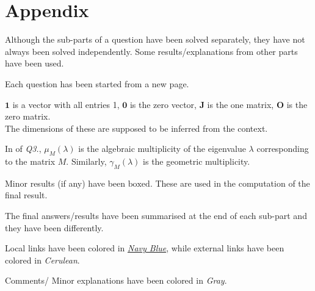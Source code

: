 \documentclass[12pt,titlepage]{report}
\begin{document}
\newpage

\hypertarget{app}{\section*{Appendix}}

\begin{itemize}
    \item Although the sub-parts of a question have been solved separately, they have not always been solved independently. Some results/explanations from other parts have been used.
    \item Each question has been started from a new page.
    \item $\mathbf{1}$ is a vector with all entries 1, $\mathbf{0}$ is the zero vector, $\mathbf{J}$ is the one matrix, $\mathbf{O}$ is the zero matrix. \\
    The dimensions of these are supposed to be inferred from the context.
    \item In  of \textit{Q3.}, $\mu_M(\lambda)$ is the algebraic multiplicity of the eigenvalue $\lambda$ corresponding to the matrix $M$. Similarly, $\gamma_M(\lambda)$ is the geometric multiplicity.
    \item Minor results (if any) have been $\boxed{\text{boxed}}$. These are used in the computation of the final result.
    \item The final answers/results have been summarised at the end of each sub-part and they have been  differently.
    \hypertarget{link}{\item} Local links have been colored in \hyperlink{link}{\color{NavyBlue} \textit{Navy Blue}}, while external links have been colored in {\color{Cerulean} \textit{Cerulean}}.
    \item Comments/ Minor explanations have been colored in {\color{Gray} \textit{Gray}}.
\end{itemize}
\end{document}
